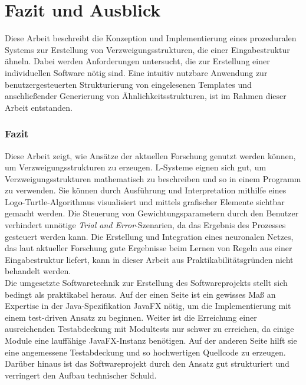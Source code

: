 
\chapter{Fazit und Ausblick}
Diese Arbeit beschreibt die Konzeption und Implementierung eines prozeduralen Systems zur Erstellung
von Verzweigungsstrukturen, die einer Eingabestruktur ähneln.
Dabei werden Anforderungen untersucht, die zur Erstellung einer individuellen Software nötig sind.
Eine intuitiv nutzbare Anwendung zur benutzergesteuerten Strukturierung von eingelesenen Templates und
anschließender Generierung von Ähnlichkeitsstrukturen, ist im Rahmen dieser Arbeit entstanden.

\subsection*{Fazit}
Diese Arbeit zeigt, wie Ansätze der aktuellen Forschung genutzt werden können, um Verzweigungsstrukturen
zu erzeugen.
L-Systeme eignen sich gut, um Verzweigungsstrukturen mathematisch zu beschreiben und so in einem
Programm zu verwenden.
Sie können durch Ausführung und Interpretation mithilfe eines Logo-Turtle-Algorithmus visualisiert
und mittels grafischer Elemente sichtbar gemacht werden.
Die Steuerung von Gewichtungsparametern durch den Benutzer verhindert unnötige
\textit{Trial and Error}-Szenarien, da das Ergebnis des Prozesses gesteuert werden kann.
Die Erstellung und Integration eines neuronalen Netzes, das laut aktueller Forschung gute Ergebnisse beim Lernen von
Regeln aus einer Eingabestruktur liefert, kann in dieser Arbeit aus Praktikabilitätsgründen nicht behandelt werden.\\
Die umgesetzte Softwaretechnik zur Erstellung des Softwareprojekts stellt sich bedingt als praktikabel
heraus.
Auf der einen Seite ist ein gewisses Maß an Expertise in der Java-Spezifikation JavaFX nötig, um
die Implementierung mit einem test-driven Ansatz zu beginnen.
Weiter ist die Erreichung einer ausreichenden Testabdeckung mit Modultests nur schwer
zu erreichen, da einige Module eine lauffähige JavaFX-Instanz benötigen.
Auf der anderen Seite hilft sie eine angemessene Testabdeckung und so hochwertigen Quellcode
zu erzeugen.
Darüber hinaus ist das Softwareprojekt durch den Ansatz gut strukturiert und verringert
den Aufbau technischer Schuld.

